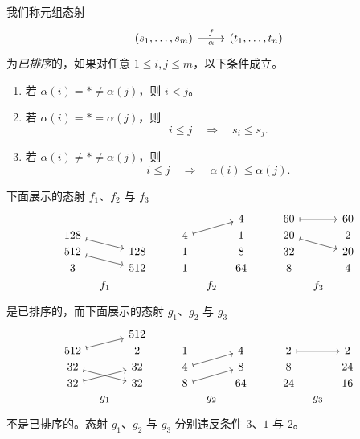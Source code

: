 \begin{definition}\label{definitionofsortedmorphisminC}
    我们称元组态射
    \[\begin{tikzcd} (s_1,\dots,s_m) \ar[r,"f"] \ar[r,swap,"\alpha"] &  (t_1,\dots,t_n) \end{tikzcd} \]
    为{\it 已排序}的，如果对任意 $1 \leq i,j \leq m$，以下条件成立。
    \begin{enumerate}
        \item 若 $\alpha(i) = * \neq \alpha(j)$，则 $i < j$。
        \item 若 $\alpha(i) = * = \alpha(j)$，则
        \[
        i \leq j \quad \Rightarrow \quad s_i \leq s_j.
        \]
        \item 若 $\alpha(i) \neq * \neq \alpha(j)$，则
        \[
        i \leq j \quad \Rightarrow \quad \alpha(i) \leq \alpha(j).
        \]

    \end{enumerate}
\end{definition}


\begin{example}\label{sortedmorphismsinCexample}
    下面展示的态射 $f_1$、$f_2$ 与 $f_3$
    \[ \begin{tikzcd} [row sep = 1, column sep = 8]
     & & & & &  & & 4 & & & 60 \ar[rr,mapsto] & & 60\\
    128 \ar[drr,mapsto] & & & & & 4 \ar[urr,mapsto] & & 1 & & & 20 \ar[rrd,mapsto] & & 2\\
    512 \ar[drr,mapsto] & & 128 & & & 1 & & 8 & & & 32 & & 20\\
    3 & & 512 & & & 1 & & 64 & & & 8 & & 4 \\
     & f_1 & & & & & f_2 & & & & & f_3 & \\
    \end{tikzcd} \]
    是已排序的，而下面展示的态射 $g_1$、$g_2$ 与 $g_3$
    \[ \begin{tikzcd}[row sep = 1, column sep = 8]
     & & 512 & & & & & & & & & & \\
    512 \ar[urr,mapsto] & & 2 & & & 1  & & 4 & & & 2 \ar[rr,mapsto] & & 2 \\
    32 \ar[drr,mapsto] & & 32 & & & 4 \ar[urr,mapsto] & & 8 & & & 8 & & 24\\
    32 \ar[urr,mapsto] & & 32 & & & 8 \ar[urr,mapsto] & & 64 & & & 24 & & 16 \\
    & g_1 & & & & & g_2 & & & & & g_3 & \\
    \end{tikzcd} \]
    不是已排序的。态射 $g_1$、$g_2$ 与 $g_3$ 分别违反条件 $3$、$1$ 与 $2$。
\end{example}


